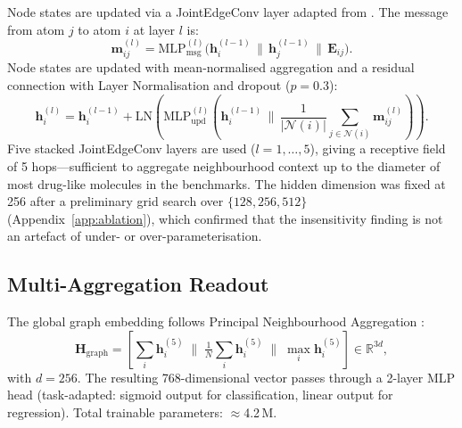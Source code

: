 \documentclass[pdflatex,sn-vancouver-num]{sn-jnl}%
\theoremstyle{thmstyleone}%
\theoremstyle{thmstyletwo}%
\theoremstyle{thmstylethree}%
\begin{document}
Node states are updated via a JointEdgeConv layer adapted from
\cite{gasteiger2021synthetic}.  The message from atom $j$ to atom $i$ at
layer $l$ is:
\begin{equation}
  \mathbf{m}_{ij}^{(l)} = \mathrm{MLP}_\mathrm{msg}^{(l)}\!\bigl(
    \mathbf{h}_i^{(l-1)} \,\|\, \mathbf{h}_j^{(l-1)} \,\|\,
    \mathbf{E}_{ij}\bigr).
  \label{eq:msg}
\end{equation}
Node states are updated with mean-normalised aggregation and a residual
connection with Layer Normalisation and dropout ($p = 0.3$):
\begin{equation}
  \mathbf{h}_i^{(l)} = \mathbf{h}_i^{(l-1)} +
  \mathrm{LN}\!\!\left(\!\mathrm{MLP}_\mathrm{upd}^{(l)}\!\!\left(
    \mathbf{h}_i^{(l-1)} \,\Big\|\,
    \frac{1}{|\mathcal{N}(i)|}\!\sum_{j \in \mathcal{N}(i)}
    \!\mathbf{m}_{ij}^{(l)}\!\right)\!\right)\!.
  \label{eq:update}
\end{equation}
Five stacked JointEdgeConv layers are used ($l = 1, \ldots, 5$), giving a
receptive field of 5 hops---sufficient to aggregate neighbourhood context
up to the diameter of most drug-like molecules in the benchmarks.  The
hidden dimension was fixed at 256 after a preliminary grid search over
$\{128, 256, 512\}$ (Appendix~\ref{app:ablation}), which confirmed that
the insensitivity finding is not an artefact of under- or over-parameterisation.

\subsection{Multi-Aggregation Readout}

The global graph embedding follows Principal Neighbourhood Aggregation
\cite{corso2020pna}:
\begin{equation}
  \mathbf{H}_\mathrm{graph} = \!\left[
    \sum_i \mathbf{h}_i^{(5)} \;\Big\|\;
    \tfrac{1}{N}\!\sum_i \mathbf{h}_i^{(5)} \;\Big\|\;
    \max_i \mathbf{h}_i^{(5)}
  \right]\! \in \mathbb{R}^{3d},
  \label{eq:readout}
\end{equation}
with $d = 256$.  The resulting 768-dimensional vector passes through a
2-layer MLP head (task-adapted: sigmoid output for classification, linear output for regression).  Total trainable parameters: $\approx$4.2\,M.
\end{document}
